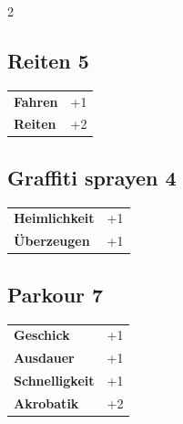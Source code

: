 \begin{multicols}{2}
\begin{tcolorbox}
\end{tcolorbox}

\begin{tcolorbox}
    \subsection*{Reiten \hfill \small{5 }}
    \tcblower




\begin{tabular}{@{}ll@{}}
    \textbf{Fahren} & +1\\
    \textbf{Reiten} & +2\\
\end{tabular}


\end{tcolorbox}

\begin{tcolorbox}
    \subsection*{Graffiti sprayen \hfill \small{4 }}
    \tcblower




\begin{tabular}{@{}ll@{}}
    \textbf{Heimlichkeit} & +1\\
    \textbf{Überzeugen} & +1\\
\end{tabular}


\end{tcolorbox}

\begin{tcolorbox}
    \subsection*{Parkour \hfill \small{7 }}
    \tcblower




\begin{tabular}{@{}ll@{}}
    \textbf{Geschick} & +1\\
    \textbf{Ausdauer} & +1\\
    \textbf{Schnelligkeit} & +1\\
    \textbf{Akrobatik} & +2\\
\end{tabular}


\end{tcolorbox}
\end{multicols}
